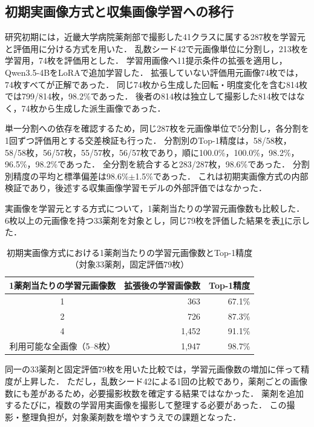 \documentclass[uplatex,dvipdfmx]{jsarticle}
\begin{document}
\subsection{初期実画像方式と収集画像学習への移行}

研究初期には，近畿大学病院薬剤部で撮影した41クラスに属する287枚を学習元と評価用に分ける方式を用いた．
乱数シード42で元画像単位に分割し，213枚を学習用，74枚を評価用とした．
学習用画像へ11提示条件の拡張を適用し，Qwen3.5-4BをLoRAで追加学習した．
拡張していない評価用元画像74枚では，74枚すべてが正解であった．
同じ74枚から生成した回転・明度変化を含む814枚では799/814枚，98.2\%であった．
後者の814枚は独立して撮影した814枚ではなく，74枚から生成した派生画像であった．

単一分割への依存を確認するため，同じ287枚を元画像単位で5分割し，各分割を1回ずつ評価用とする交差検証も行った．
分割別のTop-1精度は，58/58枚，58/58枚，56/57枚，55/57枚，56/57枚であり，順に100.0\%，100.0\%，98.2\%，96.5\%，98.2\%であった．
全分割を統合すると283/287枚，98.6\%であった．
分割別精度の平均と標準偏差は98.6\%$\pm$1.5\%であった．
これは初期実画像方式の内部検証であり，後述する収集画像学習モデルの外部評価ではなかった．

実画像を学習元とする方式について，1薬剤当たりの学習元画像数も比較した．
6枚以上の元画像を持つ33薬剤を対象とし，同じ79枚を評価した結果を表\ref{tab:fewshot_history}に示した．

\begin{table}[H]
  \centering
  \caption{初期実画像方式における1薬剤当たりの学習元画像数とTop-1精度（対象33薬剤，固定評価79枚）}
  \label{tab:fewshot_history}
  \small
  \begin{tabular}{|c|r|r|}
    \hline
    1薬剤当たりの学習元画像数 & 拡張後の学習画像数 & Top-1精度 \\ \hline
    1 & 363 & 67.1\% \\ \hline
    2 & 726 & 87.3\% \\ \hline
    4 & 1,452 & 91.1\% \\ \hline
    利用可能な全画像（5--8枚） & 1,947 & 98.7\% \\ \hline
  \end{tabular}
\end{table}

同一の33薬剤と固定評価79枚を用いた比較では，学習元画像数の増加に伴って精度が上昇した．
ただし，乱数シード42による1回の比較であり，薬剤ごとの画像数にも差があるため，必要撮影枚数を確定する結果ではなかった．
薬剤を追加するたびに，複数の学習用実画像を撮影して整理する必要があった．
この撮影・整理負担が，対象薬剤数を増やすうえでの課題となった．
\end{document}
